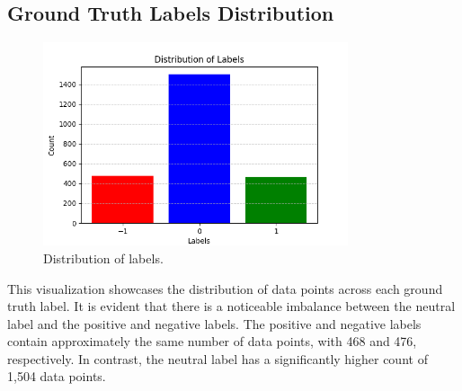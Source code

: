 \documentclass{article}
\begin{document}
\subsection*{Ground Truth Labels Distribution}
\begin{figure}[h]
    \centering
    \includegraphics[width=0.8\textwidth]{Figure_1.png}
    \caption{Distribution of labels.}
    \label{fig:sample}
\end{figure}
\noindent
This visualization showcases the distribution of data points across each ground truth label. It is evident 
that there is a noticeable imbalance between the neutral label and the positive and negative labels. The 
positive and negative labels contain approximately the same number of data points, with 468 and 476, respectively. 
In contrast, the neutral label has a significantly higher count of 1,504 data points. 
\end{document}
